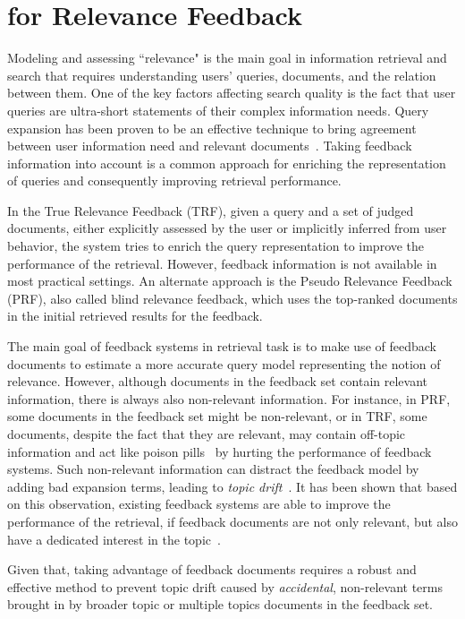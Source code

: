 \section{\acswlm for Relevance Feedback}
Modeling and assessing ``relevance" is the main goal in information retrieval and search that requires understanding users' queries, documents, and the relation between them.
One of the key factors affecting search quality is the fact that user queries are ultra-short statements of their complex information needs. Query expansion has been proven to be an effective technique to bring agreement between user information need and relevant documents~\citep{Harman:2009}. 
Taking feedback information into account is a common approach for enriching the representation of queries and consequently improving retrieval performance. 

In the True Relevance Feedback (TRF), given a query and a set of judged documents, either explicitly assessed by the user or implicitly inferred from user behavior, the system tries to enrich the query representation to improve the performance of the retrieval. However, feedback information is not available in most practical settings. An alternate approach is the Pseudo Relevance Feedback (PRF), also called blind relevance feedback, which uses the top-ranked documents in the initial retrieved results for the feedback.

The main goal of feedback systems in retrieval task is to make use of feedback documents to estimate a more accurate query model representing the notion of relevance.
%
However, although documents in the feedback set contain relevant information, there is always also non-relevant information. For instance, in PRF, some documents in the feedback set might be non-relevant, or in TRF, some documents, despite the fact that they are relevant, may contain off-topic information and act like poison pills~\citep{Terra:2005} by hurting the performance of feedback systems.  
Such non-relevant information can distract the feedback model by adding bad expansion terms, leading to \emph{topic drift}~\citep{Macdonald:2007,He:2009:ECIR}.  
It has been shown that based on this observation, existing feedback systems are able to improve the performance of the retrieval, if feedback documents are not only relevant, but also have a dedicated interest in the topic~\citep{He:2009:ECIR}.


Given that, taking advantage of feedback documents requires a robust and effective method to prevent topic drift caused by \emph{accidental}, non-relevant terms brought in by broader topic or multiple topics documents in the feedback set. 


